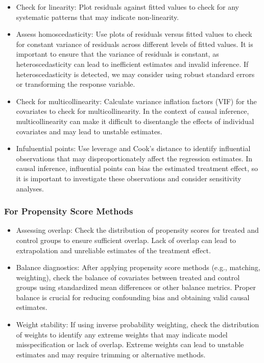\documentclass[11pt]{article}
\begin{document}
\begin{itemize}
    \item Check for linearity: Plot residuals against fitted values to check for any systematic patterns that may indicate non-linearity.
    \item Assess homoscedasticity: Use plots of residuals versus fitted values to check for constant variance of residuals across different levels of fitted values. It is important to ensure that the variance of residuals is constant, as heteroscedasticity can lead to inefficient estimates and invalid inference. If heteroscedasticity is detected, we may consider using robust standard errors or transforming the response variable.
    \item Check for multicollinearity: Calculate variance inflation factors (VIF) for the covariates to check for multicollinearity. In the context of causal inference, multicollinearity can make it difficult to disentangle the effects of individual covariates and may lead to unstable estimates. 
    \item Infuluential points: Use leverage and Cook's distance to identify influential observations that may disproportionately affect the regression estimates. In causal inference, influential points can bias the estimated treatment effect, so it is important to investigate these observations and consider sensitivity analyses.
\end{itemize}

\subsubsection{For Propensity Score Methods}

\begin{itemize}
    \item Assessing overlap: Check the distribution of propensity scores for treated and control groups to ensure sufficient overlap. Lack of overlap can lead to extrapolation and unreliable estimates of the treatment effect.
    \item Balance diagnostics: After applying propensity score methods (e.g., matching, weighting), check the balance of covariates between treated and control groups using standardized mean differences or other balance metrics. Proper balance is crucial for reducing confounding bias and obtaining valid causal estimates.
    \item Weight stability: If using inverse probability weighting, check the distribution of weights to identify any extreme weights that may indicate model misspecification or lack of overlap. Extreme weights can lead to unstable estimates and may require trimming or alternative methods.

\end{itemize}









\end{document}
